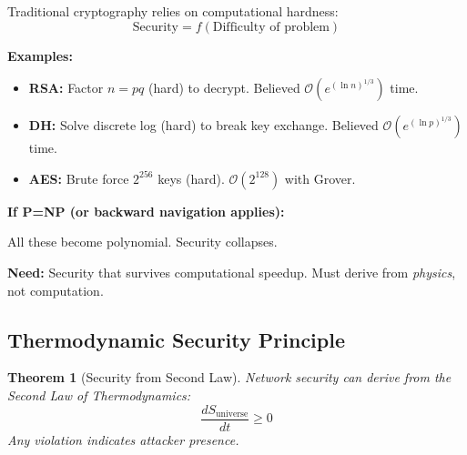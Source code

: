 \documentclass[twocolumn,10pt]{article}
\newtheorem{theorem}{Theorem}[section]
\theoremstyle{definition}
\theoremstyle{remark}
\newcommand{\bigO}{\mathcal{O}}
\begin{document}
Traditional cryptography\cite{diffie1976,rivest1978} relies on computational hardness:
\begin{equation}
\text{Security} = f(\text{Difficulty of problem})
\end{equation}

\textbf{Examples:}
\begin{itemize}
\item \textbf{RSA:} Factor $n = pq$ (hard) to decrypt. Believed $\bigO(e^{(\ln n)^{1/3}})$ time\cite{lenstra1993}.
\item \textbf{DH:} Solve discrete log (hard) to break key exchange. Believed $\bigO(e^{(\ln p)^{1/3}})$ time\cite{gordon1993}.
\item \textbf{AES:} Brute force $2^{256}$ keys (hard). $\bigO(2^{128})$ with Grover\cite{grover1996}.
\end{itemize}

\vspace{0.2cm}
\noindent\textbf{If P=NP (or backward navigation applies):}

All these become polynomial. Security collapses.

\vspace{0.2cm}
\noindent\textbf{Need:} Security that survives computational speedup. Must derive from \textit{physics}, not computation.

\subsection{Thermodynamic Security Principle}

\begin{theorem}[Security from Second Law]
\label{thm:thermodynamic_security}
Network security can derive from the Second Law of Thermodynamics:
\begin{equation}
\frac{dS_{\text{universe}}}{dt} \geq 0
\end{equation}
Any violation indicates attacker presence.
\end{theorem}
\end{document}

